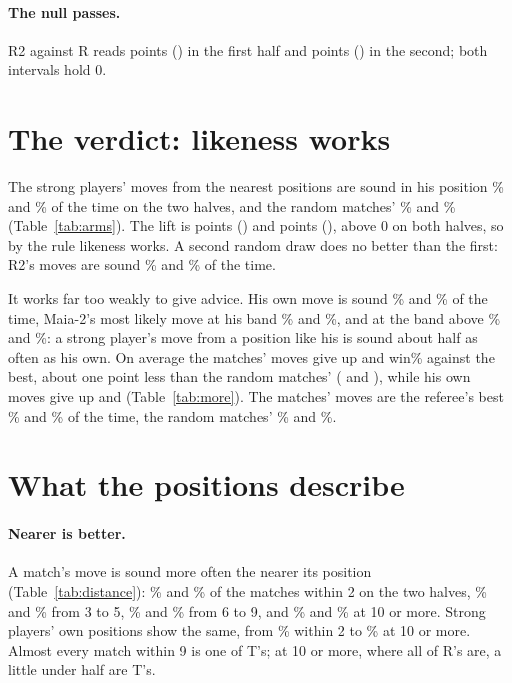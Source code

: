 \documentclass[11pt]{article}
\begin{document}
\paragraph{The null passes.} R2 against R reads \NullFirst{} points (\NullFirstCi) in the first
half and \NullSecond{} points (\NullSecondCi) in the second; both intervals hold 0.

\section{The verdict: likeness works}

\ArmTable

The strong players' moves from the \Arm{} nearest positions are sound in his position \TFirst\%
and \TSecond\% of the time on the two halves, and the random matches' \RFirst\% and \RSecond\%
(Table~\ref{tab:arms}). The lift is \LiftFirst{} points (\LiftFirstCi) and \LiftSecond{} points
(\LiftSecondCi), above 0 on both halves, so by the rule likeness works. A second random draw does
no better than the first: R2's moves are sound \RTwoFirst\% and \RTwoSecond\% of the time.

It works far too weakly to give advice. His own move is sound \AFirst\% and \ASecond\% of the
time, Maia-2's most likely move at his band \NFirst\% and \NSecond\%, and at the band above
\UFirst\% and \USecond\%: a strong player's move from a position like his is sound about half as
often as his own. On average the matches' moves give up \LostTFirst{} and \LostTSecond{} win\%
against the best, about one point less than the random matches' (\LostRFirst{} and \LostRSecond),
while his own moves give up \LostAFirst{} and \LostASecond{} (Table~\ref{tab:more}). The
matches' moves are the referee's best \BestTFirst\% and \BestTSecond\% of the time, the random
matches' \BestRFirst\% and \BestRSecond\%.

\section{What the positions describe}

\DistanceTable

\paragraph{Nearer is better.} A match's move is sound more often the nearer its position
(Table~\ref{tab:distance}): \DistZeroFirst\% and \DistZeroSecond\% of the matches within 2 on the
two halves, \DistThreeFirst\% and \DistThreeSecond\% from 3 to 5, \DistSixFirst\% and
\DistSixSecond\% from 6 to 9, and \DistTenFirst\% and \DistTenSecond\% at 10 or more. Strong
players' own positions show the same, from \StrongDistZero\% within 2 to \StrongDistTen\% at 10
or more. Almost every match within 9 is one of T's; at 10 or more, where all of R's are, a little
under half are T's.
\end{document}
